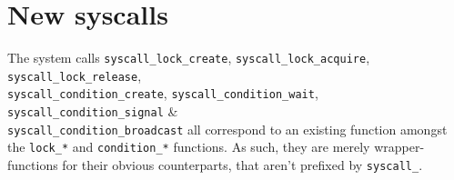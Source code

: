 \section{New syscalls}
The system calls 
\texttt{syscall\_lock\_create}, 
\texttt{syscall\_lock\_acquire}, 
\texttt{syscall\_lock\_release}, \\
\texttt{syscall\_condition\_create}, 
\texttt{syscall\_condition\_wait}, 
\texttt{syscall\_condition\_signal} \& \\ 
\texttt{syscall\_condition\_broadcast} all correspond to an existing function 
amongst the \texttt{lock\_*} and \texttt{condition\_*} functions. As such, they 
are merely wrapper-functions for their obvious counterparts, that aren't prefixed 
by \texttt{syscall\_}.
